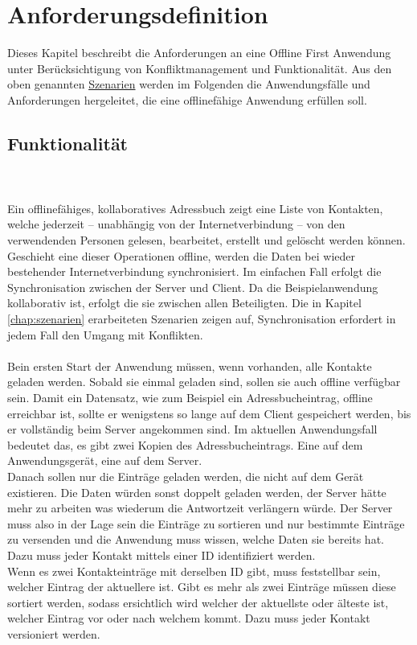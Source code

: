 \chapter{\label{chap:anforderungen}Anforderungsdefinition}
Dieses Kapitel beschreibt die Anforderungen an eine Offline First Anwendung unter Berücksichtigung von Konfliktmanagement und Funktionalität. 
Aus den oben genannten \hyperref[chap:szenarien]{Szenarien} werden im Folgenden die Anwendungsfälle und Anforderungen hergeleitet, die eine offlinefähige Anwendung erfüllen soll.
%
%

%
%
\section{Funktionalität}
\\\\
Ein offlinefähiges, kollaboratives Adressbuch zeigt eine Liste von Kontakten, welche jederzeit -- unabhängig von der Internetverbindung -- von den verwendenden Personen gelesen, bearbeitet, erstellt und gelöscht werden können.
Geschieht eine dieser Operationen offline, werden die Daten bei wieder bestehender Internetverbindung synchronisiert. Im einfachen Fall erfolgt die Synchronisation zwischen der Server und Client. Da die Beispielanwendung kollaborativ ist, erfolgt die sie zwischen allen Beteiligten. Die in Kapitel \ref{chap:szenarien} erarbeiteten Szenarien zeigen auf, Synchronisation erfordert in jedem Fall den Umgang mit Konflikten.\\\\
%
Bein ersten Start der Anwendung müssen, wenn vorhanden, alle Kontakte geladen werden. Sobald sie einmal geladen sind, sollen sie auch offline verfügbar sein.
Damit ein Datensatz, wie zum Beispiel ein Adressbucheintrag, offline erreichbar ist, sollte er wenigstens so lange auf dem Client gespeichert werden, bis er vollständig beim Server angekommen sind. Im aktuellen Anwendungsfall bedeutet das, es gibt zwei Kopien des Adressbucheintrags. Eine auf dem Anwendungsgerät, eine auf dem Server.\\
Danach sollen nur die Einträge geladen werden, die nicht auf dem Gerät existieren.
Die Daten würden sonst doppelt geladen werden, der Server hätte mehr zu arbeiten was wiederum die Antwortzeit verlängern würde.
Der Server muss also in der Lage sein die Einträge zu sortieren und nur bestimmte Einträge zu versenden und die Anwendung muss wissen, welche Daten sie bereits hat. Dazu muss jeder Kontakt mittels einer ID identifiziert werden.\\
Wenn es zwei Kontakteinträge mit derselben ID gibt, muss feststellbar sein, welcher Eintrag der aktuellere ist. Gibt es mehr als zwei Einträge müssen diese sortiert werden, sodass ersichtlich wird welcher der aktuellste oder älteste ist, welcher Eintrag vor oder nach welchem kommt. Dazu muss jeder Kontakt versioniert werden.
%
%

